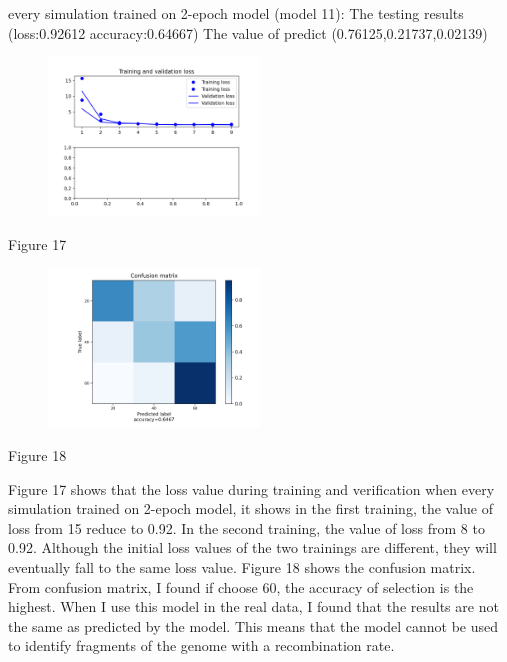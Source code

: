 \documentclass[11pt,a4 paper,title page]{article}
\begin{document}
every simulation trained on 2-epoch model (model 11):
\hfill\break 
The testing results (loss:0.92612 accuracy:0.64667)
\hfill\break 
The value of predict (0.76125,0.21737,0.02139)
\begin{figure}[H]
\centering
\includegraphics[width=0.5\textwidth,angle=360]{../picture/figure17.png}
\end{figure}
\centerline{Figure 17}
\hfill\break 
\begin{figure}[H]
\centering
\includegraphics[width=0.5\textwidth,angle=360]{../picture/figure18.png}
\end{figure}
\centerline{Figure 18}
\hfill\break
Figure 17 shows that the loss value during training and verification when every simulation trained on 2-epoch model, it shows in the first training, the value of loss from 15 reduce to 0.92. In the second training, the value of loss from 8 to 0.92. Although the initial loss values of the two trainings are different, they will eventually fall to the same loss value. Figure 18 shows the confusion matrix. From confusion matrix, I found if choose 60, the accuracy of selection is the highest. When I use this model in the real data, I found that the results are not the same as predicted by the model. This means that the model cannot be used to identify fragments of the genome with a recombination rate.
\hfill\break
\end{document}
